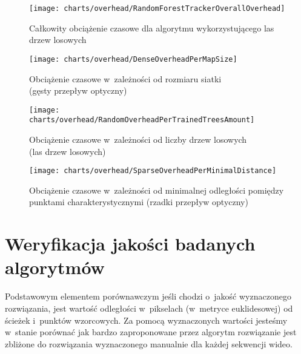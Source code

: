       \begin{figure}[!ht]
        \centering
        \texttt{[image: charts/overhead/RandomForestTrackerOverallOverhead]}
        \caption[Całkowity obciążenie czasowe dla algorytmu wykorzystującego las drzew losowych]
                {Całkowity obciążenie czasowe dla algorytmu wykorzystującego las drzew losowych}
        \label{fig:RandomForestTrackerOverhead}
      \end{figure}

    \newpage
      \begin{figure}[!ht]
        \centering
        \texttt{[image: charts/overhead/DenseOverheadPerMapSize]}
        \caption[Obciążenie czasowe w~zależności od rozmiaru siatki]
                {Obciążenie czasowe w~zależności od rozmiaru siatki\\(gęsty przepływ optyczny)}
        \label{fig:SpecialisedDenseOverhead}
      \end{figure}

      \begin{figure}[!ht]
        \centering
        \texttt{[image: charts/overhead/RandomOverheadPerTrainedTreesAmount]}
        \caption[Obciążenie czasowe w~zależności od liczby drzew losowych]
                {Obciążenie czasowe w~zależności od liczby drzew losowych\\(las drzew losowych)}
        \label{fig:SpecialisedRandomOverhead}
      \end{figure}

    \newpage
      \begin{figure}[!ht]
        \centering
        \texttt{[image: charts/overhead/SparseOverheadPerMinimalDistance]}
        \caption[Obciążenie czasowe w~zależności od minimalnej odległości pomiędzy punktami charakterystycznymi]
                {Obciążenie czasowe w~zależności od minimalnej odległości pomiędzy punktami charakterystycznymi (rzadki przepływ optyczny)}
        \label{fig:SpecialisedSparseOverhead}
      \end{figure}

  \section{Weryfikacja jakości badanych algorytmów}\label{Section_Quality}

    Podstawowym elementem porównawczym jeśli chodzi o~jakość wyznaczonego rozwiązania, jest wartość odległości w~pikselach (w~metryce euklidesowej) od ścieżek i~punktów wzorcowych. Za pomocą wyznaczonych wartości jesteśmy w~stanie porównać jak bardzo zaproponowane przez algorytm rozwiązanie jest zbliżone do rozwiązania wyznaczonego manualnie dla każdej sekwencji wideo.

